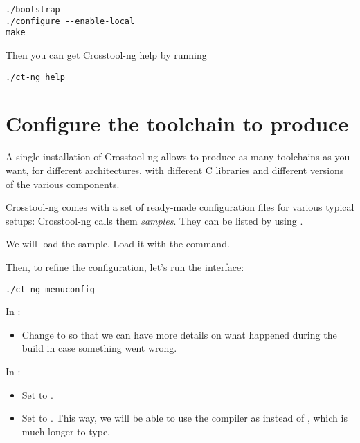 \begin{verbatim}
./bootstrap
./configure --enable-local
make
\end{verbatim}

Then you can get Crosstool-ng help by running

\begin{verbatim}
./ct-ng help
\end{verbatim}

\section{Configure the toolchain to produce}

A single installation of Crosstool-ng allows to produce as many
toolchains as you want, for different architectures, with different C
libraries and different versions of the various components.

Crosstool-ng comes with a set of ready-made configuration files for
various typical setups: Crosstool-ng calls them {\em samples}. They can be
listed by using .

We will load the
sample. Load it with the  command.

Then, to refine the configuration, let's run the  interface:

\begin{verbatim}
./ct-ng menuconfig
\end{verbatim}

In :
\begin{itemize}
\item Change  to  so that we can have more
  details on what happened during the build in case something went wrong.
\end{itemize}


In :
\begin{itemize}
\item Set  to .
\item Set  to . This way, we will
  be able to use the compiler as  instead of
  , which is much longer
  to type.
\end{itemize}

